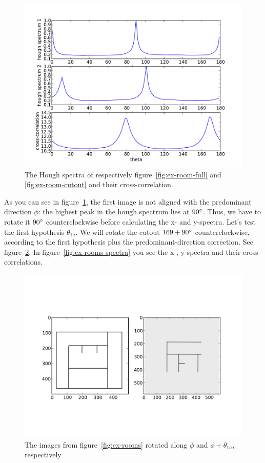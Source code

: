 \begin{figure}[ht]
	\centering
	\includegraphics[width=\textwidth]{images/stitching/rooms-ex-match-theta.pdf}
	\caption{The Hough spectra of respectively figure~\ref{fig:ex-room-full} and \ref{fig:ex-room-cutout} and their cross-correlation.}
	\label{fig:ex-rooms-theta}
\end{figure}

As you can see in figure~\ref{fig:ex-rooms-theta}, the first image is not aligned with the predominant direction $\phi$: the highest peak in the hough spectrum lies at $90\degree$. Thus, we have to rotate it $90\degree$ counterclockwise before calculating the x- and y-spectra. Let's test the first hypothesis $\theta_{1a}$. We will rotate the cutout $169 + 90 \degree$ counterclockwise, according to the first hypothesis plus the predominant-direction correction. See figure~\ref{fig:ex-rooms-rotated}. In figure~\ref{fig:ex-rooms-spectra} you see the x-, y-spectra and their cross-correlations. 

\begin{figure}[ht]
	\centering
	\includegraphics[width=\textwidth]{images/stitching/rooms-ex-rotated.pdf}
	\caption{The images from figure~\ref{fig:ex-rooms} rotated along $\phi$ and $\phi + \theta_{1a}$, respectively}
	\label{fig:ex-rooms-rotated}
\end{figure}

